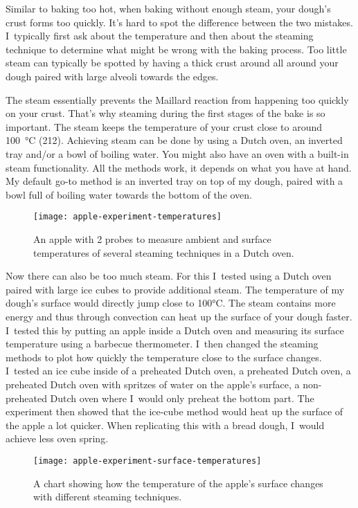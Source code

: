 Similar to baking too hot, when baking without enough steam, your dough's crust
forms too quickly. It's hard to spot the difference between the two mistakes.
I~typically first ask about the temperature and then about the steaming technique
to determine what might be wrong with the baking process. Too little steam can
typically be spotted by having a thick crust around all around your dough paired
with large alveoli towards the edges.

The steam essentially prevents the Maillard reaction from happening too quickly
on your crust. That's why steaming during the first stages of the bake is so important.
The steam keeps the temperature of your crust close to around
\qty{100}{\degreeCelsius} (\qty{212}{\degF}). Achieving steam
can be done by using a Dutch oven, an inverted tray and/or a bowl of boiling water.
You might also have an oven with a built-in steam functionality. All the methods work,
it depends on what you have at hand. My default go-to method is an inverted
tray on top of my dough, paired with a bowl full of boiling water towards the bottom
of the oven.

\begin{figure}[ht]
  \texttt{[image: apple-experiment-temperatures]}
  \caption[Measuring ambient and surface temperature]{An apple with 2 probes
      to measure ambient and surface temperatures of several steaming
      techniques in a Dutch oven.}%
  \label{apple-experiment-temperatures}
\end{figure}

Now there can also be too much steam. For this I~tested using a Dutch oven paired with large ice
cubes to provide additional steam. The temperature of my dough's surface would directly
jump close to 100°C. The steam contains more energy and thus through convection
can heat up the surface of your dough faster. I~tested this by putting an apple inside
a Dutch oven and measuring its surface temperature using a barbecue thermometer.
I~then changed the steaming methods to plot how quickly the temperature
close to the surface changes. I~tested an ice cube inside of a preheated
Dutch oven, a preheated Dutch oven, a preheated Dutch oven with spritzes
of water on the apple's surface, a non-preheated Dutch oven where I~would only preheat
the bottom part. The experiment then showed that the ice-cube method would heat up
the surface of the apple a lot quicker. When replicating this with a bread dough,
I~would achieve less oven spring.

\begin{figure}[ht]
  \texttt{[image: apple-experiment-surface-temperatures]}
  \caption[Surface temperature versus steaming technique]{A chart showing how
      the temperature of the apple's surface changes with different
      steaming techniques.}%
  \label{apple-experiment-surface-temperatures}
\end{figure}


